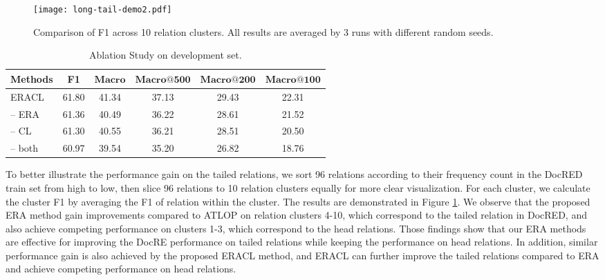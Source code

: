 \documentclass[11pt]{article}
\begin{document}
    \begin{figure}[h]
        \centering
        \texttt{[image: long-tail-demo2.pdf]}
        \caption{Comparison of F1 across 10 relation clusters. All results are averaged by 3 runs with different random seeds.}
        \label{fig:relationF1-demo}
    \end{figure}
    
      \begin{table*}[h]
        \centering
        \begin{tabular}{lccccc}
        \toprule
        Methods & F1 & $\mathbf{Macro}$ & $\mathbf{Macro@500}$ & $\mathbf{Macro@200}$ & $\mathbf{Macro@100}$ \\
        \midrule
        ERACL   & 61.80 & 41.34 & 37.13     & 29.43     & 22.31     \\
        \hline
        -- ERA   & 61.36 & 40.49 & 36.22     & 28.61     & 21.52     \\
        -- CL    & 61.30 & 40.55 & 36.21     & 28.51     & 20.50     \\
        -- both  & 60.97 & 39.54 & 35.20     & 26.82     & 18.76    \\
        \toprule
        \end{tabular}
        \caption{Ablation Study on development set.}
        \label{tb:ablation-study}
    \end{table*}
    
    To better illustrate the performance gain on the tailed relations, we sort 96 relations according to their frequency count in the DocRED train set from high to low, then slice 96 relations to 10 relation clusters equally for more clear visualization. For each cluster, we calculate the cluster F1 by averaging the F1 of relation within the cluster. The results are demonstrated in Figure \ref{fig:relationF1-demo}. We observe that the proposed ERA method gain improvements compared to ATLOP on relation clusters 4-10, which correspond to the tailed relation in DocRED, and also achieve competing performance on clusters 1-3, which correspond to the head relations. Those findings show that our ERA methods are effective for improving the DocRE performance on tailed relations while keeping the performance on head relations. In addition, similar performance gain is also achieved by the proposed ERACL method, and ERACL can further improve the tailed relations compared to ERA and achieve competing performance on head relations. 
    
\end{document}
